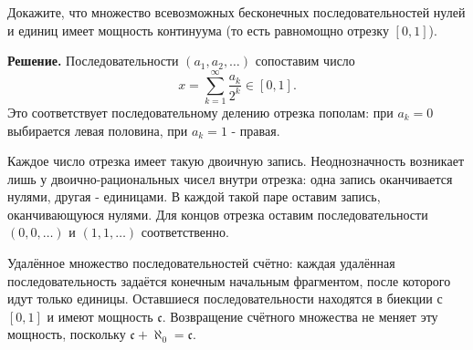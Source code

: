 \begin{problems}
\item Докажите, что множество всевозможных бесконечных последовательностей нулей и единиц имеет мощность континуума (то есть равномощно отрезку $[0,1]$).
\par\smallskip\noindent\textbf{Решение.} Последовательности $(a_1,a_2,\ldots)$ сопоставим число
\[
x=\sum_{k=1}^{\infty}\frac{a_k}{2^k}\in[0,1].
\]
Это соответствует последовательному делению отрезка пополам: при $a_k=0$ выбирается левая половина, при $a_k=1$ - правая.
\par Каждое число отрезка имеет такую двоичную запись. Неоднозначность возникает лишь у двоично-рациональных чисел внутри отрезка: одна запись оканчивается нулями, другая - единицами. В каждой такой паре оставим запись, оканчивающуюся нулями. Для концов отрезка оставим последовательности $(0,0,\ldots)$ и $(1,1,\ldots)$ соответственно.
\par Удалённое множество последовательностей счётно: каждая удалённая последовательность задаётся конечным начальным фрагментом, после которого идут только единицы. Оставшиеся последовательности находятся в биекции с $[0,1]$ и имеют мощность $\mathfrak c$. Возвращение счётного множества не меняет эту мощность, поскольку $\mathfrak c+\aleph_0=\mathfrak c$.\par


\end{problems}
